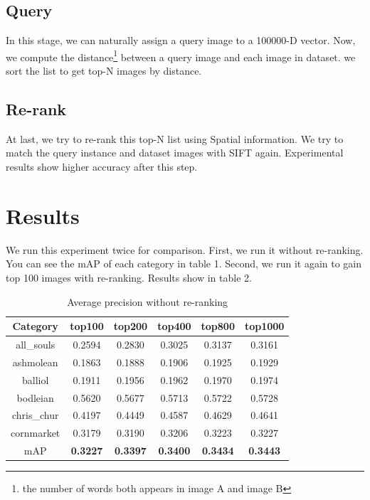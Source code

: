 \documentclass{acm_proc_article-sp}
\begin{document}
\subsection{Query}
In this stage, we can naturally assign a query image to a 100000-D vector. Now, we compute the distance\footnote{the number of words both appears in image A and image B} between a query image and each image in dataset. we sort the list to get top-N images by distance.
\subsection{Re-rank}
At last, we try to re-rank this top-N list using Spatial information. We try to match the query instance and dataset images with SIFT again. Experimental results show higher accuracy after this step.

\section{Results}
We run this experiment twice for comparison. First, we run it without re-ranking. You can see the mAP of each category in table 1. Second, we run it again to gain top 100 images with re-ranking. Results show in table 2.
\begin{table}
\centering
\begin{tabular}{|c|c|c|c|c|c|} \hline
Category    & top100 & top200 & top400 & top800 & top1000\\ \hline
all\_souls  & 0.2594 & 0.2830 & 0.3025 & 0.3137 & 0.3161\\ \hline
ashmolean   & 0.1863 & 0.1888 & 0.1906 & 0.1925 & 0.1929\\ \hline
balliol     & 0.1911 & 0.1956 & 0.1962 & 0.1970 & 0.1974\\ \hline
bodleian    & 0.5620 & 0.5677 & 0.5713 & 0.5722 & 0.5728\\ \hline
chris\_chur  & 0.4197 & 0.4449 & 0.4587 & 0.4629 & 0.4641\\ \hline
cornmarket  & 0.3179 & 0.3190 & 0.3206 & 0.3223 & 0.3227\\ \hline
mAP         & \textbf{0.3227} & \textbf{0.3397} & \textbf{0.3400} & \textbf{0.3434} & \textbf{0.3443}\\ \hline
\end{tabular}
\caption{Average precision without re-ranking}
\end{table}
\end{document}
